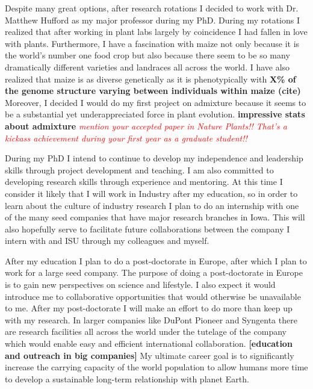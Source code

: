 \documentclass[12pt]{amsart}
\newcommand{\mbh}[1]{\textcolor{red}{ \emph{\scriptsize  #1}} }
\begin{document}
Despite many great options, after research rotations I decided to work with Dr. Matthew Hufford as my major professor during my PhD.
During my rotations I realized that after working in plant labs largely by coincidence I had fallen in love with plants.
Furthermore, I have a fascination with maize not only because it is the world's number one food crop but also because there seem to be so many dramatically different varieties and landraces all across the world.
I have also realized that maize is as diverse genetically as it is phenotypically with \textbf{X\% of the genome structure varying between individuals within maize (cite)}
Moreover, I decided I would do my first project on admixture because it seems to be a substantial yet underappreciated force in plant evolution.
\textbf{impressive stats about admixture}  \mbh{mention your accepted paper in \emph{Nature Plants}!!  That's a kickass achievement during your first year as a graduate student!!}

During my PhD I intend to continue to develop my independence and leadership skills through project development and teaching.  
I am also committed to developing research skills through experience and mentoring.  
At this time I consider it likely that I will work in Industry after my education, so in order to learn about the culture of industry research I plan to do an internship with one of the many seed companies that have major research branches in Iowa.
This will also hopefully serve to facilitate future collaborations between the company I intern with and ISU through my colleagues and myself.

After my education I plan to do a post-doctorate in Europe, after which I plan to work for a large seed company.
The purpose of doing a post-doctorate in Europe is to gain new perspectives on science and lifestyle.
I also expect it would introduce me to collaborative opportunities that would otherwise be unavailable to me.
After my post-doctorate I will make an effort to do more than keep up with my research.
In larger companies like DuPont Pioneer and Syngenta there are research facilities all across the world under the tutelage of the company which would enable easy and efficient international collaboration. \textbf{[education and outreach in big companies]}
My ultimate career goal is to significantly increase the carrying capacity of the world population to allow humans more time to develop a sustainable long-term relationship with planet Earth.
\end{document}
